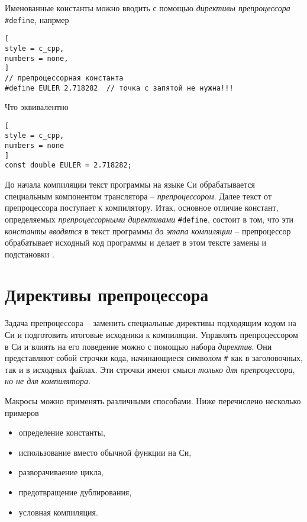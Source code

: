 \documentclass[%
	11pt,
	a4paper,
	utf8,
		]{article}
\begin{document}
Именованные константы можно вводить с помощью \emph{директивы препроцессора} \verb|#define|, напрмер
\begin{lstlisting}[
style = c_cpp,
numbers = none,
]
// препроцессорная константа
#define EULER 2.718282  // точка с запятой не нужна!!!
\end{lstlisting}

Что эквивалентно
\begin{lstlisting}[
style = c_cpp,
numbers = none
]
const double EULER = 2.718282;
\end{lstlisting}

До начала компиляции текст программы на языке Си обрабатывается специальным компонентом транслятора -- \emph{препроцессором}. Далее текст от препроцессора поступает к компилятору. Итак, основное отличие констант, определяемых \emph{препроцессорными директивами} \verb*|#define|, состоит в том, что эти \emph{константы вводятся} в текст программы \emph{до этапа компиляции} -- препроцессор обрабатывает исходный код программы и делает в этом тексте замены и подстановки \cite[]{podbelskiy-prog-c:2005}.

\section{Директивы препроцессора}

Задача препроцессора -- заменить специальные директивы подходящим кодом на Си и подготовить итоговые исходники к компиляции.  Управлять препроцессором в Си и влиять на его поведение можно с помощью набора \emph{директив}. Они представляют собой строчки кода, начинающиеся символом \verb|#| как в заголовочных, так и в исходных файлах. Эти строчки имеют смысл \emph{только для препроцессора}, \emph{но не для компилятора}.

Макросы можно применять различными способами. Ниже перечислено несколько примеров \cite[]{amini-extreme-c:2022}
\begin{itemize}
	\item определение константы,
	
	\item использование вместо обычной функции на Си,
	
	\item разворачиваение цикла,
	
	\item предотвращение дублирования,
	
	\item условная компиляция.
\end{itemize}
\end{document}
